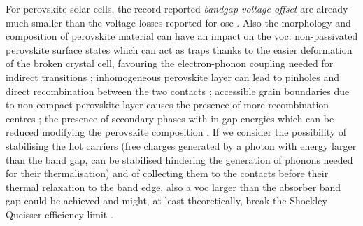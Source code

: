 	For perovskite solar cells, the record reported \textit{bandgap\hyp{}voltage offset} are already much smaller than the voltage losses reported for \gls{osc} \cite{Tvingstedt2015}.
	Also the morphology and composition of perovskite material can have an impact on the \gls{voc}: non-passivated perovskite surface states which can act as traps \cite{Zheng2017} thanks to the easier deformation of the broken crystal cell, favouring the electron-phonon coupling needed for indirect transitions \cite{Wu2015}; inhomogeneous perovskite layer can lead to pinholes and direct recombination between the two contacts \cite{Lee2015,Montcada2017,Qiu2016,Marchioro2014}; accessible grain boundaries due to non-compact perovskite layer causes the presence of more recombination centres \cite{Shao2016a}; the presence of secondary phases with in-gap energies which can be reduced modifying the perovskite composition \cite{Bi2016}.
	If we consider the possibility of stabilising the hot carriers (free charges generated by a photon with energy larger than the band gap, can be stabilised hindering the generation of phonons needed for their thermalisation) and of collecting them to the contacts before their thermal relaxation to the band edge, also a \gls{voc} larger than the absorber band gap could be achieved and might, at least theoretically, break the Shockley\hyp{}Queisser efficiency limit \cite{WikipediaSQlimit}.


